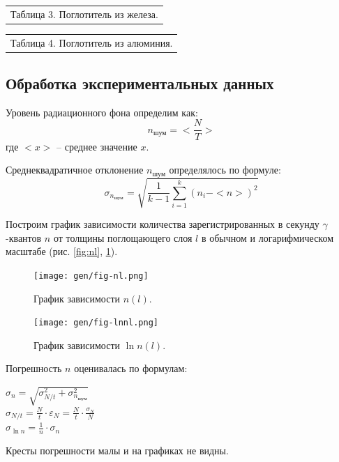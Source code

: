 \documentclass[10pt,a4paper]{article}
\begin{document}
	\begin{multicols}{2}
		\begin{tabular}[t]{l}
			Таблица 3. Поглотитель из железа. \\
			
		\end{tabular}
		
		\begin{tabular}[t]{l}
			Таблица 4. Поглотитель из алюминия. \\
			
		\end{tabular}
	\end{multicols}
	
	\subsection*{Обработка экспериментальных данных}
	
	Уровень радиационного фона определим как:
	$$
	n_{шум} = <\frac{N}{T}>
	$$
	где $<x>$ -- среднее значение $x$.
	$$$$
	
	Среднеквадратичное отклонение $n_{шум}$ определялось по формуле:
	$$
	\sigma_{n_{шум}} = \sqrt{\frac{1}{k - 1} \sum_{i = 1}^{k}(n_i - <n>)^2}
	$$
	
	Построим график зависимости количества зарегистрированных в секунду $\gamma$-квантов $n$ от толщины поглощающего слоя $l$ в обычном и логарифмическом масштабе (рис. \ref{fig:nl}, \ref{fig:lnnl}).
	
	\begin{figure}[H]
		\centering
		\begin{minipage}[c]{0.48\textwidth}
			\centering
			\texttt{[image: gen/fig-nl.png]}
			
			\caption{График зависимости $n(l)$.}
			\label{fig:nl}
		\end{minipage}
		\hfill
		\begin{minipage}[c]{0.48\textwidth}
			\centering
			\texttt{[image: gen/fig-lnnl.png]}
			
			\caption{График зависимости $\ln n(l)$.}
			\label{fig:lnnl}
		\end{minipage}
	\end{figure}

	Погрешность $n$ оценивалась по формулам: \\
	\begin{center}
		$
		\sigma_n = \sqrt{\sigma_{N/t}^2 + \sigma_{n_{шум}}^2}
		$\\
		$
		\sigma_{N/t} = \frac{N}{t} \cdot \varepsilon_{N} = \frac{N}{t} \cdot \frac{\sigma_N}{N}
		$\\
		$
		\sigma_{\ln n} = \frac{1}{n} \cdot \sigma_n
		$\\
	\end{center}
	Кресты погрешности малы и на графиках не видны.
	
\end{document}
